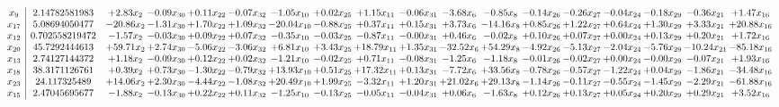 \documentclass[9pt]{article}
\begin{document}
 \[\begin{array}{c| c c@{\hskip 2pt} c@{\hskip 2pt} c@{\hskip 2pt} c@{\hskip 2pt} c@{\hskip 2pt} c@{\hskip 2pt} c@{\hskip 2pt} c@{\hskip 2pt} c@{\hskip 2pt} c@{\hskip 2pt} c@{\hskip 2pt} c@{\hskip 2pt} c@{\hskip 2pt} c@{\hskip 2pt} c@{\hskip 2pt} c@{\hskip 2pt} }
 x_{9}   &  2.14782581983 & +  2.83 x_{2} & -0.09 x_{30} & +  0.11 x_{22} & -0.07 x_{32} & -1.05 x_{10} & +  0.02 x_{25} & +  1.15 x_{11} & -0.06 x_{31} & -3.68 x_{6} & -0.85 x_{8} & -0.14 x_{26} & -0.26 x_{27} & -0.04 x_{24} & -0.18 x_{29} & -0.36 x_{21} & +  1.47 x_{16}\\
 x_{17}   &  5.08694050477 & -20.86 x_{2} & -1.31 x_{30} & +  1.70 x_{22} & +  1.09 x_{32} & -20.04 x_{10} & -0.88 x_{25} & +  0.37 x_{11} & +  0.15 x_{31} & +  3.73 x_{6} & -14.16 x_{8} & +  0.85 x_{26} & +  1.22 x_{27} & +  0.64 x_{24} & +  1.30 x_{29} & +  3.33 x_{21} & + 20.88 x_{16}\\
 x_{12}   &  0.702558219472 & -1.57 x_{2} & -0.03 x_{30} & +  0.09 x_{22} & +  0.07 x_{32} & -0.35 x_{10} & -0.03 x_{25} & -0.87 x_{11} & -0.00 x_{31} & +  0.46 x_{6} & -0.02 x_{8} & +  0.10 x_{26} & +  0.07 x_{27} & +  0.00 x_{24} & +  0.13 x_{29} & +  0.20 x_{21} & +  1.72 x_{16}\\
 x_{20}   &  45.7292444613 & + 59.71 x_{2} & +  2.74 x_{30} & -5.06 x_{22} & -3.06 x_{32} & +  6.81 x_{10} & +  3.43 x_{25} & + 18.79 x_{11} & +  1.35 x_{31} & -32.52 x_{6} & + 54.29 x_{8} & -4.92 x_{26} & -5.13 x_{27} & -2.04 x_{24} & -5.76 x_{29} & -10.24 x_{21} & -85.18 x_{16}\\
 x_{13}   &  2.74127144372 & +  1.18 x_{2} & -0.09 x_{30} & +  0.12 x_{22} & +  0.02 x_{32} & -1.21 x_{10} & -0.02 x_{25} & +  0.71 x_{11} & -0.08 x_{31} & -1.25 x_{6} & -1.18 x_{8} & -0.01 x_{26} & -0.02 x_{27} & +  0.00 x_{24} & -0.00 x_{29} & -0.07 x_{21} & +  1.93 x_{16}\\
 x_{18}   &  38.3171126761 & +  0.39 x_{2} & +  0.73 x_{30} & -1.30 x_{22} & -0.79 x_{32} & + 13.93 x_{10} & +  0.51 x_{25} & + 17.32 x_{11} & +  0.13 x_{31} & -7.72 x_{6} & + 33.56 x_{8} & -0.78 x_{26} & -0.57 x_{27} & -1.22 x_{24} & +  0.04 x_{29} & -1.86 x_{21} & -34.48 x_{16}\\
 x_{23}   &  24.117325489 & + 14.06 x_{2} & +  2.30 x_{30} & -4.44 x_{22} & -1.08 x_{32} & + 20.49 x_{10} & +  1.99 x_{25} & -3.32 x_{11} & +  1.20 x_{31} & + 21.02 x_{6} & + 29.13 x_{8} & -1.14 x_{26} & -0.11 x_{27} & -0.55 x_{24} & -1.45 x_{29} & -2.29 x_{21} & -61.88 x_{16}\\
 x_{15}   &  2.47045695677 & -1.88 x_{2} & -0.13 x_{30} & +  0.22 x_{22} & +  0.11 x_{32} & -1.25 x_{10} & -0.13 x_{25} & -0.05 x_{11} & -0.04 x_{31} & +  0.06 x_{6} & -1.63 x_{8} & +  0.12 x_{26} & +  0.13 x_{27} & +  0.05 x_{24} & +  0.20 x_{29} & +  0.29 x_{21} & +  3.52 x_{16}\\

\end{array}\]
\end{document}
